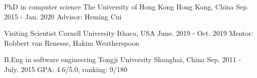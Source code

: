 

\begin{cventries}


\cventry
{PhD in computer science} %
{The University of Hong Kong} %
{Hong Kong, China} %
{Sep. 2015 - Jan. 2020} %
{ %
Advisor: Heming Cui
}


\cventry
{Visiting Scientist} %
{Cornell University} %
{Ithaca, USA} %
{June. 2019 - Oct. 2019} %
{ %
Mentor: Robbert van Renesse, Hakim Weatherspoon
}


\cventry
{B.Eng in software engineering} %
{Tongji University} %
{Shanghai, China} %
{Sep. 2011 - July. 2015} %
{ %
GPA: 4.6/5.0, ranking: 9/180
}

\end{cventries}